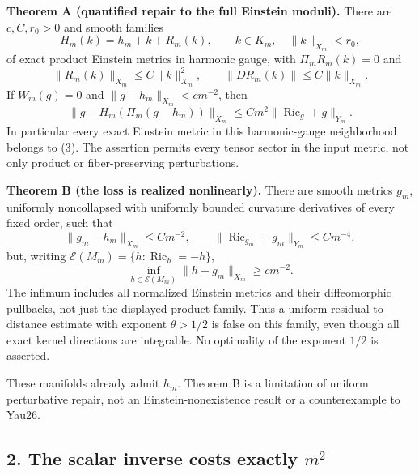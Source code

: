 \documentclass[
  11pt,
]{article}
\begin{document}
\textbf{Theorem A (quantified repair to the full Einstein moduli).}
There are \(c,C,r_0>0\) and smooth families \[
 H_m(k)=h_m+k+R_m(k),\qquad k\in K_m,\quad \|k\|_{X_m}<r_0,
                                                               \tag{3}
\] of exact product Einstein metrics in harmonic gauge, with
\(\Pi_mR_m(k)=0\) and \[
 \|R_m(k)\|_{X_m}\le C\|k\|_{X_m}^2,\qquad
 \|DR_m(k)\|\le C\|k\|_{X_m}.
                                                               \tag{4}
\] If \(W_m(g)=0\) and \(\|g-h_m\|_{X_m}<c m^{-2}\), then \[
 \boxed{\quad
 \|g-H_m(\Pi_m(g-h_m))\|_{X_m}
       \le C m^2\|\operatorname{Ric}_g+g\|_{Y_m}.
 \quad}                                                       \tag{5}
\] In particular every exact Einstein metric in this harmonic-gauge
neighborhood belongs to (3). The assertion permits every tensor sector
in the input metric, not only product or fiber-preserving perturbations.

\textbf{Theorem B (the loss is realized nonlinearly).} There are smooth
metrics \(g_m\), uniformly noncollapsed with uniformly bounded curvature
derivatives of every fixed order, such that \[
 \|g_m-h_m\|_{X_m}\le C m^{-2},\qquad
 \|\operatorname{Ric}_{g_m}+g_m\|_{Y_m}\le C m^{-4},
                                                               \tag{6}
\] but, writing \(\mathscr E(M_m)=\{h:\operatorname{Ric}_h=-h\}\), \[
 \boxed{\quad
 \inf_{h\in\mathscr E(M_m)}\|h-g_m\|_{X_m}\ge c m^{-2}.
 \quad}                                                       \tag{7}
\] The infimum includes all normalized Einstein metrics and their
diffeomorphic pullbacks, not just the displayed product family. Thus a
uniform residual-to-distance estimate with exponent \(\theta>1/2\) is
false on this family, even though all exact kernel directions are
integrable. No optimality of the exponent \(1/2\) is asserted.

These manifolds already admit \(h_m\). Theorem B is a limitation of
uniform perturbative repair, not an Einstein-nonexistence result or a
counterexample to Yau26.

\hypertarget{the-scalar-inverse-costs-exactly-m2}{%
\subsection{\texorpdfstring{2. The scalar inverse costs exactly
\(m^2\)}{2. The scalar inverse costs exactly m\^{}2}}\label{the-scalar-inverse-costs-exactly-m2}}
\end{document}
